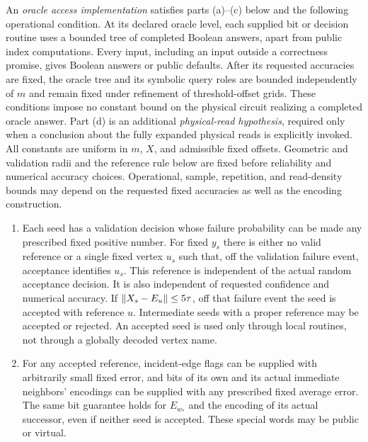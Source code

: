 \begin{definition}\label{geo:access-contract}
An \emph{oracle access implementation} satisfies parts (a)--(c) below
and the following operational condition. At its declared oracle level,
each supplied bit or decision routine uses a bounded tree of completed
Boolean answers, apart from public index computations. Every input,
including an input outside a correctness promise, gives Boolean answers
or public defaults. After its requested accuracies are fixed, the
oracle tree and its symbolic query roles are bounded independently of
$m$ and remain fixed under refinement of threshold-offset grids.
These conditions impose no constant bound on the physical circuit
realizing a completed oracle answer. Part (d) is an additional
\emph{physical-read hypothesis}, required only when a conclusion about
the fully expanded physical reads is explicitly invoked. All constants
are uniform in $m$, $X$, and admissible fixed offsets. Geometric and
validation radii and the reference rule below are fixed before
reliability and numerical accuracy choices. Operational, sample,
repetition, and read-density bounds may depend on the requested fixed
accuracies as well as the encoding construction.
\begin{enumerate}[label=\textup{(\alph*)},leftmargin=*]
\item\label{geo:access-validation}
Each seed has a validation decision whose failure probability can be
made any prescribed fixed positive number. For fixed $y_s$ there is
either no valid reference or a single fixed vertex $u_s$ such that, off
the validation failure event, acceptance identifies $u_s$. This
reference is independent of the actual random acceptance decision.
It is also independent of requested confidence and numerical accuracy.
If $\lVert X_s-E_u\rVert\le5\tau$, off that failure event the seed is
accepted with reference $u$. Intermediate seeds with a proper reference
may be accepted or rejected. An accepted seed is used only through
local routines, not through a globally decoded vertex name.
\item\label{geo:access-bits}
For any accepted reference, incident-edge flags can be supplied with
arbitrarily small fixed error, and bits of its own and its actual
immediate neighbors' encodings can be supplied with any prescribed
fixed average error. The same bit guarantee holds for $E_{w_*}$ and
the encoding of its actual successor, even if neither seed is accepted.
These special words may be public or virtual.


\end{enumerate}
\end{definition}
